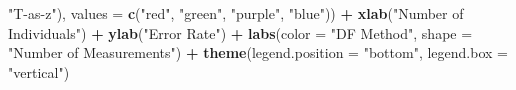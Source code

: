 \documentclass[12pt, twoside]{amherstthesis}
\newenvironment{Shaded}{\begin{snugshade}}{\end{snugshade}}
\newcommand{\DataTypeTok}[1]{\textcolor[rgb]{0.13,0.29,0.53}{#1}}
\newcommand{\KeywordTok}[1]{\textcolor[rgb]{0.13,0.29,0.53}{\textbf{#1}}}
\newcommand{\NormalTok}[1]{#1}
\newcommand{\OperatorTok}[1]{\textcolor[rgb]{0.81,0.36,0.00}{\textbf{#1}}}
\newcommand{\StringTok}[1]{\textcolor[rgb]{0.31,0.60,0.02}{#1}}
\begin{document}
\begin{Shaded}
\begin{Highlighting}[]
{{{{{{{{{{                                \StringTok{"T-as-z"}\NormalTok{), }
                     \DataTypeTok{values =} \KeywordTok{c}\NormalTok{(}\StringTok{"red"}\NormalTok{, }\StringTok{"green"}\NormalTok{, }\StringTok{"purple"}\NormalTok{, }\StringTok{"blue"}\NormalTok{)) }\OperatorTok{+}
\StringTok{  }\KeywordTok{xlab}\NormalTok{(}\StringTok{"Number of Individuals"}\NormalTok{) }\OperatorTok{+}
\StringTok{  }\KeywordTok{ylab}\NormalTok{(}\StringTok{"Error Rate"}\NormalTok{) }\OperatorTok{+}
\StringTok{  }\KeywordTok{labs}\NormalTok{(}\DataTypeTok{color =} \StringTok{"DF Method"}\NormalTok{, }\DataTypeTok{shape =} \StringTok{"Number of Measurements"}\NormalTok{) }\OperatorTok{+}
\StringTok{  }\KeywordTok{theme}\NormalTok{(}\DataTypeTok{legend.position =} \StringTok{"bottom"}\NormalTok{, }\DataTypeTok{legend.box =} \StringTok{"vertical"}\NormalTok{)}


}}}}}}}}}}
\end{Highlighting}
\end{Shaded}
\end{document}
